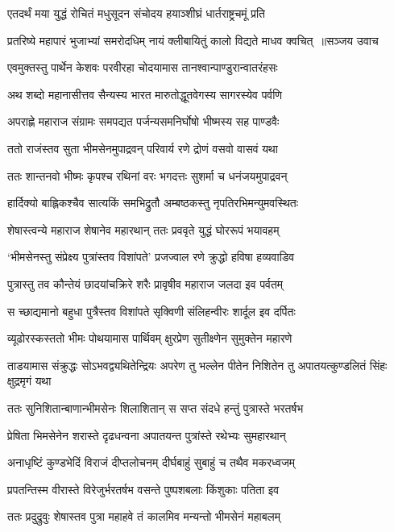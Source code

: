 \twolineshloka
{एतदर्थं मया युद्धं रोचितं मधुसूदन}
{संचोदय हयाञ्शीघ्रं धार्तराष्ट्रचमूं प्रति}


\threelineshloka
{प्रतरिष्ये महापारं भुजाभ्यां समरोदधिम्}
{नायं क्लीबायितुं कालो विद्यते माधव क्वचित् ॥सञ्जय उवाच}
{}


\twolineshloka
{एवमुक्तस्तु पार्थेन केशवः परवीरहा}
{चोदयामास तानश्वान्पाण्डुरान्वातरंहसः}


\twolineshloka
{अथ शब्दो महानासीत्तव सैन्यस्य भारत}
{मारुतोद्धूतवेगस्य सागरस्येव पर्वणि}


\twolineshloka
{अपराह्णे महाराज संग्रामः समपद्यत}
{पर्जन्यसमनिर्घोषो भीष्मस्य सह पाण्डवैः}


\twolineshloka
{ततो राजंस्तव सुता भीमसेनमुपाद्रवन्}
{परिवार्य रणे द्रोणं वसवो वासवं यथा}


\twolineshloka
{ततः शान्तनवो भीष्मः कृपश्च रथिनां वरः}
{भगदत्तः सुशर्मा च धनंजयमुपाद्रवन्}


\twolineshloka
{हार्दिक्यो बाह्लिकश्चैव सात्यकिं समभिद्रुतौ}
{अम्बष्ठकस्तु नृपतिरभिमन्युमवस्थितः}


\twolineshloka
{शेषास्त्वन्ये महाराज शेषानेव महारथान्}
{ततः प्रववृते युद्धं घोररूपं भयावहम्}


\twolineshloka
{`भीमसेनस्तु संप्रेक्ष्य पुत्रांस्तव विशांपते'}
{प्रजज्वाल रणे क्रुद्धो हविषा हव्यवाडिव}


\twolineshloka
{पुत्रास्तु तव कौन्तेयं छादयांचक्रिरे शरैः}
{प्रावृषीव महाराज जलदा इव पर्वतम्}


\twolineshloka
{स च्छाद्यमानो बहुधा पुत्रैस्तव विशांपते}
{सृक्विणी संलिहन्वीरः शार्दूल इव दर्पितः}


\twolineshloka
{व्यूढोरस्कस्ततो भीमः पोथयामास पार्थिवम्}
{क्षुरप्रेण सुतीक्ष्णेन सुमुक्तेन महारणे}


\threelineshloka
{ताडयामास संक्रुद्धः सोऽभवद्व्यथितेन्द्रियः}
{अपरेण तु भल्लेन पीतेन निशितेन तु}
{अपातयत्कुण्डलितं सिंहः क्षुद्रमृगं यथा}


\twolineshloka
{ततः सुनिशितान्बाणान्भीमसेनः शिलाशितान्}
{स सप्त संदधे हन्तुं पुत्रास्ते भरतर्षभ}


\twolineshloka
{प्रेषिता भिमसेनेन शरास्ते दृढधन्वना}
{अपातयन्त पुत्रांस्ते रथेभ्यः सुमहारथान्}


\twolineshloka
{अनाधृष्टिं कुण्डभेदिं विराजं दीप्तलोचनम्}
{दीर्घबाहुं सुबाहुं च तथैव मकरध्वजम्}


\twolineshloka
{प्रपतन्तिस्म वीरास्ते विरेजुर्भरतर्षभ}
{वसन्ते पुष्पशबलाः किंशुकाः पतिता इव}


\twolineshloka
{ततः प्रदुद्रुवुः शेषास्तव पुत्रा महाहवे}
{तं कालमिव मन्यन्तो भीमसेनं महाबलम्}


